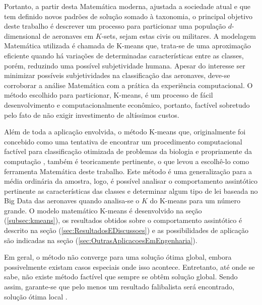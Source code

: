 \documentclass[12pt]{article} %
\begin{document}
			Portanto, a partir desta Matemática moderna, ajustada a sociedade atual e que tem definido novos padrões de solução somado à taxonomia, o principal objetivo deste trabalho é descrever um processo para particionar uma população $ d $-dimensional de aeronaves em $ K $-sets, sejam estas civis ou militares. A modelagem Matemática utilizada é chamada de K-means que, trata-se de uma aproximação eficiente quando há variações de determinadas características entre as classes, porém, reduzindo uma possível subjetividade humana. Apesar do interesse ser minimizar possíveis subjetividades na classificação das aeronaves, deve-se corroborar a análise Matemática com a prática da experiência computacional. O método escolhido para particionar, K-means, é um processo de fácil desenvolvimento e computacionalmente econômico, portanto, factível sobretudo pelo fato de não exigir investimento de altíssimos custos.
			
			Além de toda a aplicação envolvida, o método K-means que, originalmente foi concebido como uma tentativa de encontrar um procedimento computacional factível para classificação otimizada de problemas da biologia e propriamente da computação \cite{MacQueen1967}, também é teoricamente pertinente, o que levou a escolhê-lo como ferramenta Matemática deste trabalho. Este método é uma generalização para a média ordinária da amostra, logo, é possível analisar o comportamento assintótico pertinente as características das classes e determinar algum tipo de lei baseada no Big Data das aeronaves quando analisa-se o $ K $ do K-means para um número grande. O modelo matemático K-means é desenvolvido na seção (\ref{subsec:kmeans}), os resultados obtidos sobre o comportamento assintótico é descrito na seção (\ref{sec:ResultadosEDiscussoes}) e as possibilidades de aplicação são indicadas na seção (\ref{sec:OutrasAplicacoesEmEngenharia}).
			
			Em geral, o método não converge para uma solução ótima global, embora possivelmente existam casos especiais onde isso acontece. Entretanto, até onde se sabe, não existe método factível que sempre se obtêm solução global. Sendo assim, garante-se que pelo menos um resultado falibalista será encontrado, solução ótima local \cite{MacQueen1967}.
\end{document}
